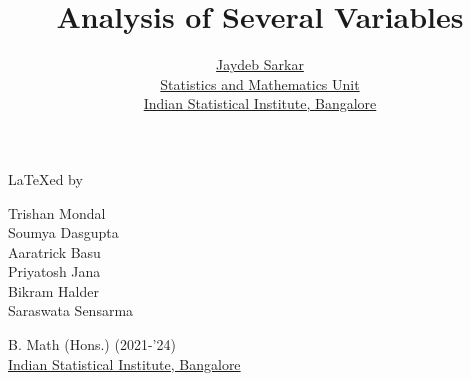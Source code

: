 \documentclass{report}
\title{\Huge\sffamily Analysis of Several Variables}
\author{{\LARGE\sffamily \href{https://www.isibang.ac.in/~jay/}{Jaydeb Sarkar}} \\[0.5cm]
  \href{https://www.isibang.ac.in/~statmath}{Statistics and Mathematics Unit} \\
  \href{https://www.isibang.ac.in}{Indian Statistical Institute, Bangalore}}
\date{}
\begin{document}



\maketitle

{\vspace*{\fill}\centering
  {\LARGE \LaTeX ed by}
  \vspace{0.5cm}
  \begin{center}
    \large
    Trishan Mondal \\
    Soumya Dasgupta \\
    Aaratrick Basu \\
    Priyatosh Jana \\
    Bikram Halder \\
    Saraswata Sensarma
  \end{center}
  \vspace{0.5cm}
  \begin{center}
    B. Math (Hons.) (2021-'24) \\
    \href{https://www.isibang.ac.in}{Indian Statistical Institute, Bangalore}
  \end{center}
  \vspace*{\fill}}

\tableofcontents
























\end{document}
